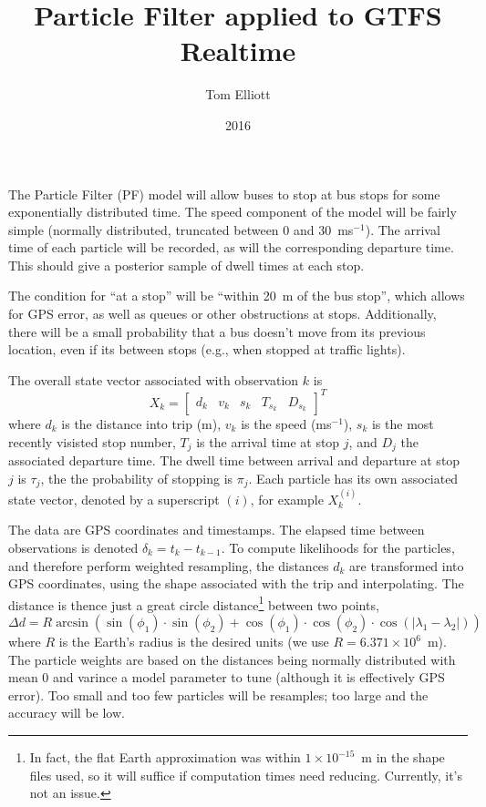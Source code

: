 \documentclass[10pt,a4paper]{article}
\title{Particle Filter applied to GTFS Realtime}
\author{Tom Elliott}
\date{2016}
\begin{document}
\maketitle


The Particle Filter (PF) model will allow buses to stop at bus stops
for some exponentially distributed time.
The speed component of the model will be fairly simple
(normally distributed, truncated between 0 and 30~ms$^{-1}$).
The arrival time of each particle will be recorded, 
as will the corresponding departure time. 
This should give a posterior sample of dwell times at each stop.


The condition for ``at a stop'' will be ``within 20~m of the bus stop'',
which allows for GPS error, as well as queues or other obstructions at stops.
Additionally, there will be a small probability that a bus doesn't move from its
previous location, even if its between stops (e.g., when stopped at traffic lights).



The overall state vector associated with observation $k$ is
\begin{equation}
  \label{eq:state_vector}
  X_k =
  \begin{bmatrix}
    d_k & v_k & s_k & T_{s_k} & D_{s_k}
  \end{bmatrix}^T
\end{equation}
where $d_k$ is the distance into trip (m),
$v_k$ is the speed (ms$^{-1}$),
$s_k$ is the most recently visisted stop number,
$T_j$ is the arrival time at stop $j$,
and $D_j$ the associated departure time.
The dwell time between arrival and departure at stop $j$ is $\tau_j$,
the the probability of stopping is $\pi_j$.
Each particle has its own associated state vector, denoted by a superscript $(i)$,
for example $X_k^{(i)}$.

The data are GPS coordinates and timestamps.
The elapsed time between observations is denoted $\delta_k = t_k - t_{k-1}$.
To compute likelihoods for the particles, and therefore perform weighted resampling,
the distances $d_k$ are transformed into GPS coordinates, using the shape associated
with the trip and interpolating.
The distance is thence just a great circle distance\footnote{In fact, 
the flat Earth approximation was within $1\times 10^{-15}$~m in the shape files used, 
so it will suffice if computation times need reducing. Currently, it's not an issue.}
between two points,
\begin{equation}
  \label{eq:greatcircle}
  \Delta d = R \arcsin(\sin(\phi_1) \cdot \sin(\phi_2) +
  \cos(\phi_1) \cdot \cos(\phi_2) \cdot \cos(|\lambda_1 - \lambda_2|))
\end{equation}
where $R$ is the Earth's radius is the desired units (we use $R = 6.371\times 10^6$~m).
The particle weights are based on the distances being normally distributed
with mean 0 and varince a model parameter to tune (although it is effectively GPS error).
Too small and too few particles will be resamples; too large and the accuracy will be low.
\end{document}
